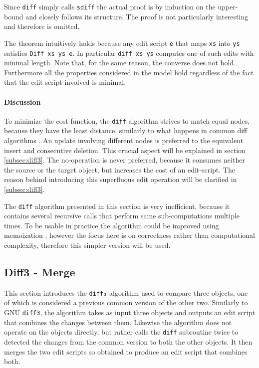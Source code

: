 \documentclass[../Thesis.tex]{subfiles}
\begin{document}
	Since \texttt{diff} simply calls \texttt{sdiff} 	 the actual proof is 
	by induction on the upper-bound and closely follows its
	structure. The proof is not particularly interesting and therefore is omitted.

	The theorem intuitively holds because any edit script \texttt{e} that maps 
	\texttt{xs} into \texttt{ys} satisfies \texttt{Diff xs ys e}.
	In particular \texttt{diff xs ys} computes one of such edits with minimal 
	length.
	Note that, for the same reason, the converse does not hold.
	Furthermore all the properties considered in the model hold regardless of 
	the fact that the edit script involved is minimal.
	
	\paragraph{Discussion}
	To minimize the cost function, the \texttt{diff} algorithm strives to 
	match equal nodes, because they have the least distance, similarly to 
	what happens in common diff algorithms \cite{Lemp09}.
	An update involving different nodes is preferred to the equivalent 
	insert and consecutive deletion. This crucial aspect will be explained
	in section \ref{subsec:diff3}.
	The no-operation is never preferred, because it consumes neither the
	source or the target object, but increases the cost of an edit-script.
	The reason behind introducing this superfluous edit operation	will be 
	clarified in \ref{subsec:diff3}.

	The \texttt{diff} algorithm presented in this section is very inefficient,
	because it contains several recursive calls that perform same 
	sub-computations multiple times. 
	To be usable in practice the algorithm could be improved using 
	memoization \cite{Lemp09}, however the focus here is on correctness 
	rather than computational complexity, therefore this simpler version will
	be used.

	\subsection{Diff3 - Merge} 
	\label{subsec:diff3}

	This section introduces the \texttt{diff₃} algorithm used to compare 
	three objects, one of which is considered a previous common version
	of the other two.
	Similarly to GNU \texttt{diff3}, the algorithm takes as input three objects
	and outputs an edit script that combines the changes between them.
	Likewise the algorithm does not operate on the objects directly,
	but rather calls the \texttt{diff} subroutine twice to detected the changes 
	from the common version to both the other objects.
	It then merges the two edit scripts so obtained to produce an edit script
	that combines both.
	
\end{document}
